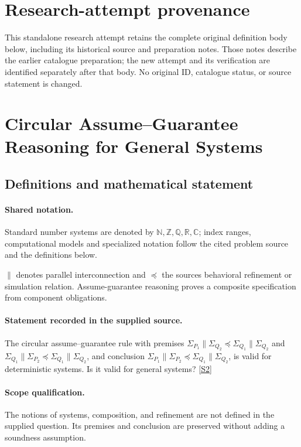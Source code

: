 \documentclass[11pt]{article}
\begin{document}
\section*{Research-attempt provenance}
This standalone research attempt retains the complete original definition body below,
including its historical source and preparation notes. Those notes describe the
earlier catalogue preparation; the new attempt and its verification are identified
separately after that body. No original ID, catalogue status, or source statement is changed.

\section{Circular Assume–Guarantee Reasoning for General Systems}\label{statement}

\subsection{Definitions and mathematical statement}

\paragraph{Shared notation.}Standard number systems are denoted by $\mathbb N,\mathbb Z,\mathbb Q,\mathbb R,\mathbb C$; index ranges, computational models and specialized notation follow the cited problem source and the definitions below.


$\parallel$ denotes parallel interconnection and $\preccurlyeq$ the source\textquotesingle s behavioral refinement or simulation relation. Assume-guarantee reasoning proves a composite specification from component obligations.
\paragraph{Statement recorded in the supplied source.}
The circular assume–guarantee rule with premises $\Sigma_{P_1}\parallel\Sigma_{Q_2}\preccurlyeq\Sigma_{Q_1}\parallel\Sigma_{Q_2}$ and $\Sigma_{Q_1}\parallel\Sigma_{P_2}\preccurlyeq\Sigma_{Q_1}\parallel\Sigma_{Q_2}$, and conclusion $\Sigma_{P_1}\parallel\Sigma_{P_2}\preccurlyeq\Sigma_{Q_1}\parallel\Sigma_{Q_2}$, is valid for deterministic systems. Is it valid for general systems? \href{https://doi.org/10.4171/owr/2009/11}{[S2]}
\paragraph{Scope qualification.}
The notions of systems, composition, and refinement are not defined in the supplied question. Its premises and conclusion are preserved without adding a soundness assumption.
\end{document}
